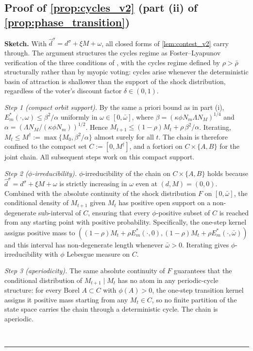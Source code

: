 \documentclass[11pt,twoside]{extarticle}
\newenvironment{proof}[1][Proof]{\noindent \textbf{#1.} }{\ \rule{0.5em}{0.5em}}
\begin{document}
\subsection*{Proof of \autoref{prop:cycles_v2} (part (ii) of \autoref{prop:phase_transition})} \label{app:proof:cycles_v2}

\begin{proof}[Sketch]
With $\hat d^\sigma=d^\sigma+\xi M+\omega$, all closed forms of \autoref{lem:contest_v2} carry through. The argument structures the cycles regime as Foster–Lyapunov verification of the three conditions of \citet[Thm.~13.0.1]{meynMarkovChainsStochastic2012}, with the cycles regime defined by $\rho>\bar\rho$ structurally rather than by myopic voting: cycles arise whenever the deterministic basin of attraction is shallower than the support of the shock distribution, regardless of the voter's discount factor $\delta\in(0,1)$.

\textit{Step 1 (compact orbit support).} By the same a priori bound as in part (i), $E_m^*(\cdot,\omega)\le\beta^2/\alpha$ uniformly in $\omega\in[0,\bar\omega]$, where $\beta=(\kappa\phi N_m\Lambda N_M)^{1/4}$ and $\alpha=(\Lambda N_M/(\kappa\phi N_m))^{1/2}$. Hence $M_{t+1}\le(1-\rho)M_t+\rho\,\beta^2/\alpha$. Iterating, $M_t\le M^\dagger:=\max\{M_0,\beta^2/\alpha\}$ almost surely for all $t$. The chain is therefore confined to the compact set $C:=[0,M^\dagger]$, and a fortiori on $C\times\{A,B\}$ for the joint chain. All subsequent steps work on this compact support.

\textit{Step 2 ($\phi$-irreducibility).} $\phi$-irreducibility of the chain on $C\times\{A,B\}$ holds because $\hat d^\sigma=d^\sigma+\xi M+\omega$ is strictly increasing in $\omega$ even at $(d,M)=(0,0)$. Combined with the absolute continuity of the shock distribution $F$ on $[0,\bar\omega]$, the conditional density of $M_{t+1}$ given $M_t$ has positive open support on a non-degenerate sub-interval of $C$, ensuring that every $\phi$-positive subset of $C$ is reached from any starting point with positive probability. Specifically, the one-step kernel assigns positive mass to $((1-\rho)M_t+\rho E_m^*(\cdot,0),(1-\rho)M_t+\rho E_m^*(\cdot,\bar\omega))$ and this interval has non-degenerate length whenever $\bar\omega>0$. Iterating gives $\phi$-irreducibility with $\phi$ Lebesgue measure on $C$.

\textit{Step 3 (aperiodicity).} The same absolute continuity of $F$ guarantees that the conditional distribution of $M_{t+1}\mid M_t$ has no atom in any periodic-cycle structure: for every Borel $A\subset C$ with $\phi(A)>0$, the one-step transition kernel assigns it positive mass starting from any $M_t\in C$, so no finite partition of the state space carries the chain through a deterministic cycle. The chain is aperiodic.


\end{proof}
\end{document}
